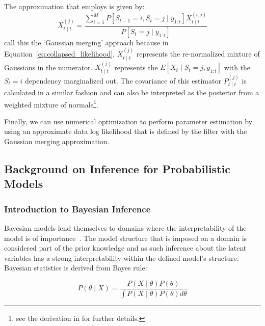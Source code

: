 The approximation that \cite{kim1994dynamic} employs is given by:
\begin{equation}\label{eq:collapsed_likelihood}
  X_{t \mid t}^{(j)} = \frac{\sum\limits_{i=1}^{M} P[S_{t-1}=i, S_t=j \mid y_{1:t}]X_{t \mid t}^{(i,j)}}{P[S_t = j \mid y_{1:t}]}
\end{equation}
\cite{ghahramani2000variational} call this the `Gaussian merging' approach because in Equation~\ref{eq:collapsed_likelihood}, $X_{t \mid t}^{(j)}$ represents the re-normalized mixture of Gaussians in the numerator. $X_{t \mid t}^{(j)}$ represents the $E[X_t \mid S_t = j, y_{1:t}]$ with the $S_t = i$ dependency marginalized out. The covariance of this estimator $P_{t \mid t}^{(j)}$ is calculated in a similar fashion and can also be interpreted as the posterior from a weighted mixture of normals\footnote{see the derivation in \cite{kim1994dynamic} for further details.}.

Finally, we can use numerical optimization to perform parameter estimation by using an approximate data log likelihood that is defined by the filter with the Gaussian merging approximation.

\subsection{Background on Inference for Probabilistic Models}

\subsubsection{Introduction to Bayesian Inference}

Bayesian models lend themselves to domains where the interpretability of the model is of importance~\citep{gelman2014bayesian}. The model structure that is imposed on a domain is considered part of the prior knowledge and as such inference about the latent variables has a strong interpretability within the defined model's structure. Bayesian statistics is derived from Bayes rule:

\begin{equation}\label{eq:bayes_rule}
	P(\theta \mid X) = \frac{P(X \mid \theta)P(\theta)}{\int P(X \mid \theta)P(\theta) d\theta}
\end{equation}

